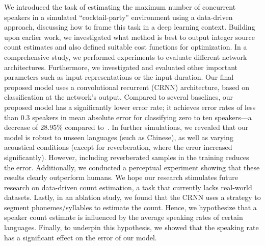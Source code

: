We introduced the task of estimating the maximum number of concurrent speakers in a simulated ``cocktail-party'' environment using a data-driven approach, discussing how to frame this task in a deep learning context.
Building upon earlier work, we investigated what method is best to output integer source count estimates and also defined suitable cost functions for optimization.
In a comprehensive study, we performed experiments to evaluate different network architectures.
Furthermore, we investigated and evaluated other important parameters such as input representations or the input duration.
Our final proposed model uses a convolutional recurrent (CRNN) architecture, based on classification at the network's output.
Compared to several baselines, our proposed model has a significantly lower error rate;
it achieves error rates of less than 0.3 speakers in mean absolute error for classifying zero to ten speakers---a decrease of 28.95\% compared to~\cite{stoeter17}.
In further simulations, we revealed that our model is robust to unseen languages (such as Chinese), as well as varying acoustical conditions (except for reverberation, where the error increased significantly).
However, including reverberated samples in the training reduces the error.
Additionally, we conducted a perceptual experiment showing that these results clearly outperform humans.
We hope our research stimulates future research on data-driven count estimation, a task that currently lacks real-world datasets.
Lastly, in an ablation study, we found that the CRNN uses a strategy to segment phonemes/syllables to estimate the count.
Hence, we hypothesize that a speaker count estimate is influenced by the average speaking rates of certain languages.
Finally, to underpin this hypothesis, we showed that the speaking rate has a significant effect on the error of our model.

